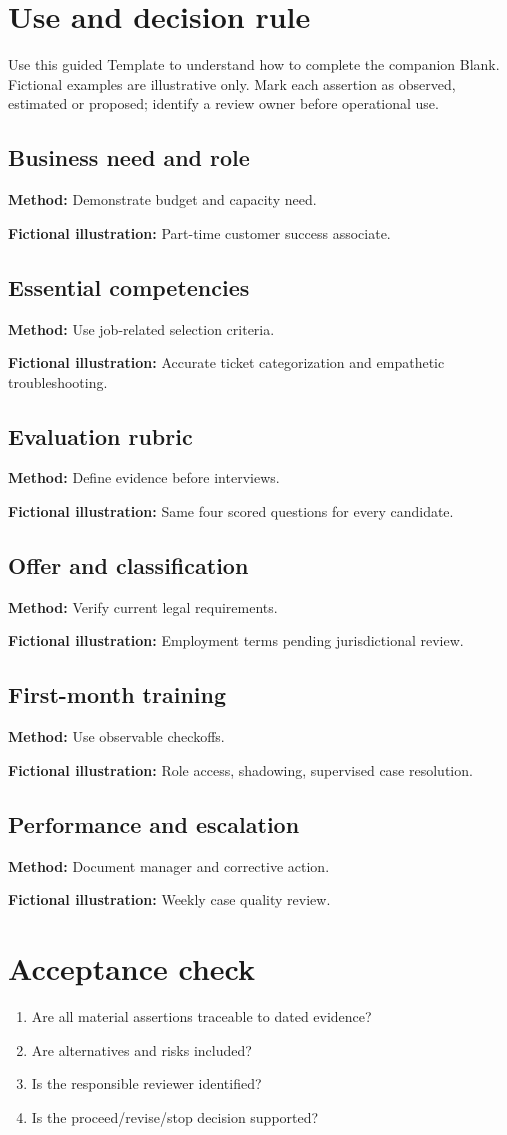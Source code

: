 \documentclass[11pt]{article}
\begin{document}
\SuiteOpen
\section{Use and decision rule}
Use this guided Template to understand how to complete the companion Blank. Fictional examples are illustrative only. Mark each assertion as observed, estimated or proposed; identify a review owner before operational use.
\subsection*{Business need and role}
\textbf{Method:} Demonstrate budget and capacity need.\par\textbf{Fictional illustration:} Part-time customer success associate.\par
\subsection*{Essential competencies}
\textbf{Method:} Use job-related selection criteria.\par\textbf{Fictional illustration:} Accurate ticket categorization and empathetic troubleshooting.\par
\subsection*{Evaluation rubric}
\textbf{Method:} Define evidence before interviews.\par\textbf{Fictional illustration:} Same four scored questions for every candidate.\par
\subsection*{Offer and classification}
\textbf{Method:} Verify current legal requirements.\par\textbf{Fictional illustration:} Employment terms pending jurisdictional review.\par
\subsection*{First-month training}
\textbf{Method:} Use observable checkoffs.\par\textbf{Fictional illustration:} Role access, shadowing, supervised case resolution.\par
\subsection*{Performance and escalation}
\textbf{Method:} Document manager and corrective action.\par\textbf{Fictional illustration:} Weekly case quality review.\par
\section{Acceptance check}
\begin{enumerate}[leftmargin=*,itemsep=5pt]
\item Are all material assertions traceable to dated evidence?
\item Are alternatives and risks included?
\item Is the responsible reviewer identified?
\item Is the proceed/revise/stop decision supported?
\end{enumerate}
\end{document}
